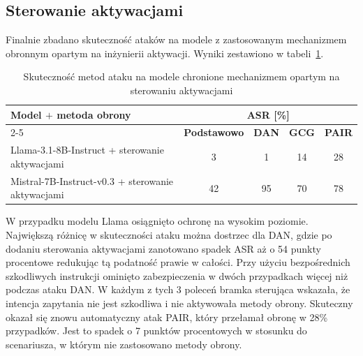 \subsection{Sterowanie aktywacjami}
Finalnie zbadano skuteczność ataków na modele z zastosowanym mechanizmem obronnym opartym na inżynierii aktywacji. Wyniki zestawiono w tabeli~\ref{tab:act_comparison_tab}.
\begin{table}[!ht]
    \centering
    \renewcommand{\arraystretch}{1.2}
    \begin{tabular}{l|c|c|c|c}
        \hline
        \multirow{2}{*}{\textbf{Model $+$ metoda obrony}} & \multicolumn{4}{c}{\textbf{ASR [\%]}}                                               \\\cline{2-5}
                                                          & \textbf{Podstawowo}                   & \textbf{DAN} & \textbf{GCG} & \textbf{PAIR} \\\hline
        Llama-3.1-8B-Instruct + sterowanie aktywacjami    & 3                                     & 1            & 14           & 28            \\\hline
        Mistral-7B-Instruct-v0.3 + sterowanie aktywacjami & 42                                    & 95           & 70           & 78            \\\hline
    \end{tabular}
    \caption{\label{tab:act_comparison_tab}Skuteczność metod ataku na modele chronione mechanizmem opartym na sterowaniu aktywacjami}
\end{table}
W przypadku modelu Llama osiągnięto ochronę na wysokim poziomie. Największą różnicę w skuteczności ataku można dostrzec dla \gls{DAN}, gdzie po dodaniu sterowania aktywacjami zanotowano spadek \gls{ASR} aż o 54 punkty procentowe redukując tą podatność prawie w całości. Przy użyciu bezpośrednich szkodliwych instrukcji ominięto zabezpieczenia w dwóch przypadkach więcej niż podczas ataku \gls{DAN}. W każdym z tych 3 poleceń bramka sterująca wskazała, że intencja zapytania nie jest szkodliwa i nie aktywowała metody obrony. Skuteczny okazał się znowu automatyczny atak \gls{PAIR}, który przełamał obronę w 28\% przypadków. Jest to spadek o 7 punktów procentowych w stosunku do scenariusza, w którym nie zastosowano metody obrony.
